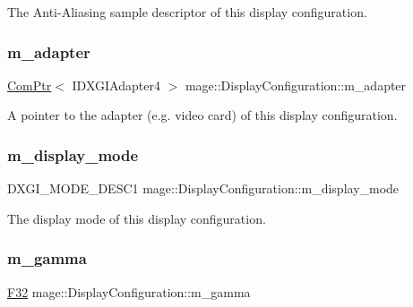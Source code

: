 The Anti-\/\+Aliasing sample descriptor of this display configuration. \hypertarget{structmage_1_1_display_configuration_a30ccc2ff8cb8e041e0afc6dabdb0d967}{}\label{structmage_1_1_display_configuration_a30ccc2ff8cb8e041e0afc6dabdb0d967} 
\subsubsection{\texorpdfstring{m\+\_\+adapter}{m\_adapter}}
{\footnotesize\ttfamily \hyperlink{namespacemage_ae74f374780900893caa5555d1031fd79}{Com\+Ptr}$<$ I\+D\+X\+G\+I\+Adapter4 $>$ mage\+::\+Display\+Configuration\+::m\+\_\+adapter\hspace{0.3cm}{\ttfamily [private]}}

A pointer to the adapter (e.\+g. video card) of this display configuration. \hypertarget{structmage_1_1_display_configuration_ac59d5e7c5553ef4842090bf1a83bd7ca}{}\label{structmage_1_1_display_configuration_ac59d5e7c5553ef4842090bf1a83bd7ca} 
\subsubsection{\texorpdfstring{m\+\_\+display\+\_\+mode}{m\_display\_mode}}
{\footnotesize\ttfamily D\+X\+G\+I\+\_\+\+M\+O\+D\+E\+\_\+\+D\+E\+S\+C1 mage\+::\+Display\+Configuration\+::m\+\_\+display\+\_\+mode\hspace{0.3cm}{\ttfamily [private]}}

The display mode of this display configuration. \hypertarget{structmage_1_1_display_configuration_a6056d18cba04331488bb27eb033c783e}{}\label{structmage_1_1_display_configuration_a6056d18cba04331488bb27eb033c783e} 
\subsubsection{\texorpdfstring{m\+\_\+gamma}{m\_gamma}}
{\footnotesize\ttfamily \hyperlink{namespacemage_aa97e833b45f06d60a0a9c4fc22ae02c0}{F32} mage\+::\+Display\+Configuration\+::m\+\_\+gamma\hspace{0.3cm}{\ttfamily [private]}}

